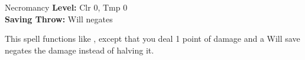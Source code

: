 {Necromancy}
{
	\textbf{Level:}
	Clr 0, Tmp 0\\
	\textbf{Saving Throw:}
	Will negates\\
}
{
	This spell functions like , except that you deal 1 point of damage and a Will save negates the damage instead of halving it.

}
